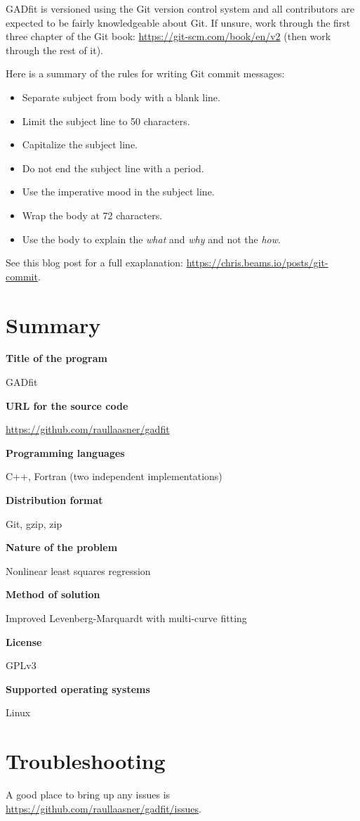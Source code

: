 \documentclass{article}
\begin{document}
GADfit is versioned using the Git version control system and all contributors are expected to be fairly knowledgeable about Git. If unsure, work through the first three chapter of the Git book: \url{https://git-scm.com/book/en/v2} (then work through the rest of it).

Here is a summary of the rules for writing Git commit messages:
\begin{itemize}
\item Separate subject from body with a blank line.
\item Limit the subject line to 50 characters.
\item Capitalize the subject line.
\item Do not end the subject line with a period.
\item Use the imperative mood in the subject line.
\item Wrap the body at 72 characters.
\item Use the body to explain the \textit{what} and \textit{why} and not the \textit{how}.
\end{itemize}
See this blog post for a full exaplanation: \url{https://chris.beams.io/posts/git-commit}.

\section{Summary}

\noindent\textbf{Title of the program}

GADfit

\noindent\textbf{URL for the source code}

\url{https://github.com/raullaasner/gadfit}

\noindent\textbf{Programming languages}

C++, Fortran (two independent implementations)

\noindent\textbf{Distribution format}

Git, gzip, zip

\noindent\textbf{Nature of the problem}

Nonlinear least squares regression

\noindent\textbf{Method of solution}

Improved Levenberg-Marquardt with multi-curve fitting

\noindent\textbf{License}

GPLv3

\noindent\textbf{Supported operating systems}

Linux

\section{Troubleshooting}

A good place to bring up any issues is \\ \url{https://github.com/raullaasner/gadfit/issues}.



\end{document}
